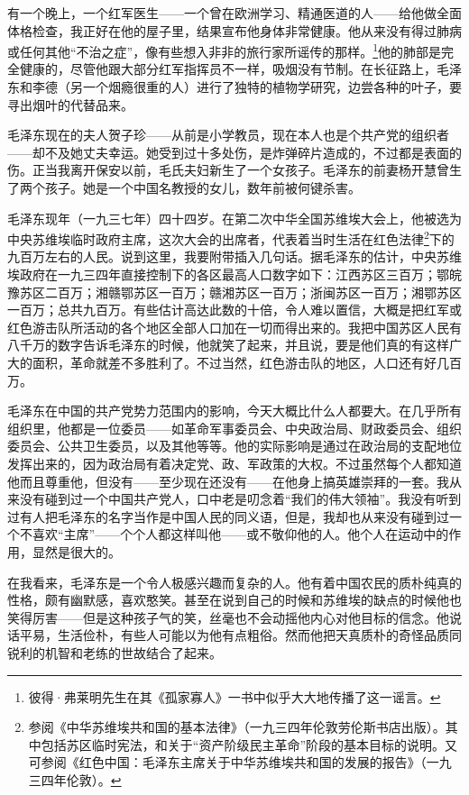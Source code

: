 \documentclass[10pt]{book}
\begin{document}
有一个晚上，一个红军医生——一个曾在欧洲学习、精通医道的人——给他做全面体格检查，我正好在他的屋子里，结果宣布他身体非常健康。他从来没有得过肺病或任何其他“不治之症”，像有些想入非非的旅行家所谣传的那样。\footnote{彼得·弗莱明先生在其《孤家寡人》一书中似乎大大地传播了这一谣言。}他的肺部是完全健康的，尽管他跟大部分红军指挥员不一样，吸烟没有节制。在长征路上，毛泽东和李德（另一个烟瘾很重的人）进行了独特的植物学研究，边尝各种的叶子，要寻出烟叶的代替品来。

毛泽东现在的夫人贺子珍——从前是小学教员，现在本人也是个共产党的组织者——却不及她丈夫幸运。她受到过十多处伤，是炸弹碎片造成的，不过都是表面的伤。正当我离开保安以前，毛氏夫妇新生了一个女孩子。毛泽东的前妻杨开慧曾生了两个孩子。她是一个中国名教授的女儿，数年前被何键杀害。

毛泽东现年（一九三七年）四十四岁。在第二次中华全国苏维埃大会上，他被选为中央苏维埃临时政府主席，这次大会的出席者，代表着当时生活在红色法律\footnote{参阅《中华苏维埃共和国的基本法律》（一九三四年伦敦劳伦斯书店出版）。其中包括苏区临时宪法，和关于“资产阶级民主革命”阶段的基本目标的说明。又可参阅《红色中国：毛泽东主席关于中华苏维埃共和国的发展的报告》（一九三四年伦敦）。}下的九百万左右的人民。说到这里，我要附带插入几句话。据毛泽东的估计，中央苏维埃政府在一九三四年直接控制下的各区最高人口数字如下：江西苏区三百万；鄂皖豫苏区二百万；湘赣鄂苏区一百万；赣湘苏区一百万；浙闽苏区一百万；湘鄂苏区一百万；总共九百万。有些估计高达此数的十倍，令人难以置信，大概是把红军或红色游击队所活动的各个地区全部人口加在一切而得出来的。我把中国苏区人民有八千万的数字告诉毛泽东的时候，他就笑了起来，并且说，要是他们真的有这样广大的面积，革命就差不多胜利了。不过当然，红色游击队的地区，人口还有好几百万。

毛泽东在中国的共产党势力范围内的影响，今天大概比什么人都要大。在几乎所有组织里，他都是一位委员——如革命军事委员会、中央政治局、财政委员会、组织委员会、公共卫生委员，以及其他等等。他的实际影响是通过在政治局的支配地位发挥出来的，因为政治局有着决定党、政、军政策的大权。不过虽然每个人都知道他而且尊重他，但没有——至少现在还没有——在他身上搞英雄崇拜的一套。我从来没有碰到过一个中国共产党人，口中老是叨念着“我们的伟大领袖”。我没有听到过有人把毛泽东的名字当作是中国人民的同义语，但是，我却也从来没有碰到过一个不喜欢“主席”——个个人都这样叫他——或不敬仰他的人。他个人在运动中的作用，显然是很大的。

在我看来，毛泽东是一个令人极感兴趣而复杂的人。他有着中国农民的质朴纯真的性格，颇有幽默感，喜欢憨笑。甚至在说到自己的时候和苏维埃的缺点的时候他也笑得厉害——但是这种孩子气的笑，丝毫也不会动摇他内心对他目标的信念。他说话平易，生活俭朴，有些人可能以为他有点粗俗。然而他把天真质朴的奇怪品质同锐利的机智和老练的世故结合了起来。
\end{document}
